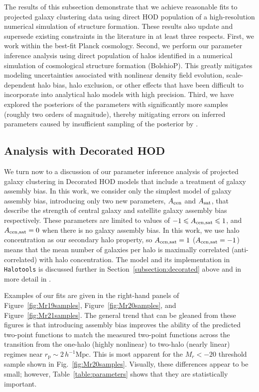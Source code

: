 \documentclass[usenatbib,usegraphicx,letterpaper]{mn2e}
\newcommand{\rp}{r_{\mathrm{p}}}
\begin{document}
The results of this subsection demonstrate that we achieve reasonable fits to projected galaxy clustering
data using direct HOD population of a high-resolution numerical simulation of structure formation. These results
also update and supersede existing constraints in the literature in at least three respects. First, we work within the
best-fit Planck cosmology. Second, we perform our parameter inference analysis using direct population of halos
identified in a numerical simulation of cosmological structure formation (BolshioP). This greatly mitigates modeling
uncertainties associated with nonlinear density field evolution, scale-dependent halo bias, halo exclusion,
or other effects that have been difficult to incorporate into analytical halo models with high precision. Third,
we have explored the posteriors of the parameters with significantly more samples (roughly two orders of magnitude),
thereby mitigating errors on inferred parameters caused by insufficient sampling of the
posterior by \citet{zehavi_etal11}.

\subsection{Analysis with Decorated HOD}
\label{subsection:ab}

We turn now to a discussion of our parameter inference analysis of projected galaxy clustering
in Decorated HOD models that include a treatment of galaxy assembly bias. In this work,
we consider only the simplest model of galaxy assembly bias, introducing only two new
parameters, $A_{\rm cen}$ and $A_{\rm sat}$, that describe the strength of central galaxy
and satellite galaxy assembly bias respectively. These parameters are limited to values
of $-1 \le A_{\rm cen,sat} \le 1$, and $A_{\rm cen,sat}=0$ when there is no galaxy assembly bias.
In this work, we use halo concentration as our secondary halo property, so $A_{\rm cen,sat}=1$
($A_{\rm cen,sat}=-1$) means that the mean number of galaxies per halo is maximally
correlated (anti-correlated) with halo concentration. The model and its implementation
in {\tt Halotools} is discussed further in Section~\ref{subsection:decorated} above and
in more detail in \citet{hearin_etal16}.

Examples of our fits are given in the right-hand panels of Figure~\ref{fig:Mr19samples},
Figure~\ref{fig:Mr20samples}, and Figure~\ref{fig:Mr21samples}. The general trend that
can be gleaned from these figures is that introducing assembly bias improves the ability
of the predicted two-point functions to match the measured two-point functions across the
transition from the one-halo (highly nonlinear) to two-halo (nearly linear) regimes near $\rp \sim 2\, h^{-1}{\mathrm{Mpc}}$.
This is most apparent for the $M_r < -20$ threshold sample shown in Fig.~\ref{fig:Mr20samples}.
Visually, these differences appear to be small; however, Table~\ref{table:parameters} shows that
they are statistically important.
\end{document}
